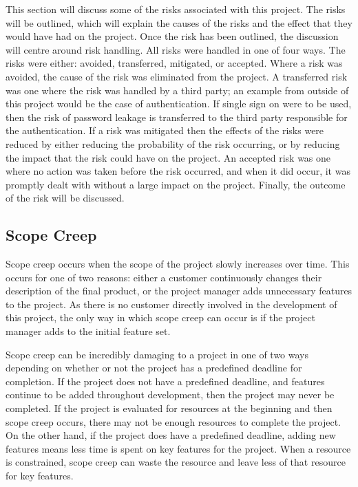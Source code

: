 \documentclass{article}
\begin{document}
This section will discuss some of the risks associated with this project. The risks will be outlined, which will explain the causes of the risks and the effect that they would have had on the project. Once the risk has been outlined, the discussion will centre around risk handling. All risks were handled in one of four ways. The risks were either: avoided, transferred, mitigated, or accepted. Where a risk was avoided, the cause of the risk was eliminated from the project. A transferred risk was one where the risk was handled by a third party; an example from outside of this project would be the case of authentication. If single sign on were to be used, then the risk of password leakage is transferred to the third party responsible for the authentication. If a risk was mitigated then the effects of the risks were reduced by either reducing the probability of the risk occurring, or by reducing the impact that the risk could have on the project. An accepted risk was one where no action was taken before the risk occurred, and when it did occur, it was promptly dealt with without a large impact on the project. Finally, the outcome of the risk will be discussed. \par

\subsection{Scope Creep}

Scope creep occurs when the scope of the project slowly increases over time. This occurs for one of two reasons: either a customer continuously changes their description of the final product, or the project manager adds unnecessary features to the project. As there is no customer directly involved in the development of this project, the only way in which scope creep can occur is if the project manager adds to the initial feature set. \par

Scope creep can be incredibly damaging to a project in one of two ways depending on whether or not the project has a predefined deadline for completion. If the project does not have a predefined deadline, and features continue to be added throughout development, then the project may never be completed. If the project is evaluated for resources at the beginning and then scope creep occurs, there may not be enough resources to complete the project. On the other hand, if the project does have a predefined deadline, adding new features means less time is spent on key features for the project. When a resource is constrained, scope creep can waste the resource and leave less of that resource for key features. \par
\end{document}
